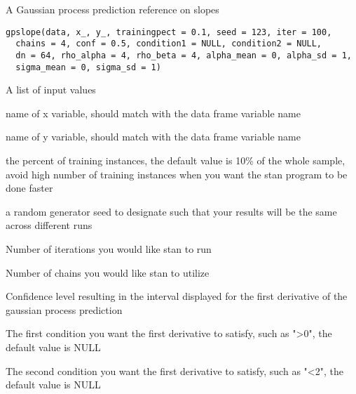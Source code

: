 %
\begin{Description}\relax
A Gaussian process prediction reference on slopes
\end{Description}
%
\begin{Usage}
\begin{verbatim}
gpslope(data, x_, y_, trainingpect = 0.1, seed = 123, iter = 100,
  chains = 4, conf = 0.5, condition1 = NULL, condition2 = NULL,
  dn = 64, rho_alpha = 4, rho_beta = 4, alpha_mean = 0, alpha_sd = 1,
  sigma_mean = 0, sigma_sd = 1)
\end{verbatim}
\end{Usage}
%
\begin{Arguments}
\begin{ldescription}
\item[\code{data}] A list of input values

\item[\code{x\_}] name of x variable, should match with the data frame variable name

\item[\code{y\_}] name of y variable, should match with the data frame variable name

\item[\code{trainingpect}] the percent of training instances, the default value is 10\% of the whole sample, avoid high number of training instances when you want the stan program to be done faster

\item[\code{seed}] a random generator seed to designate such that your results will be the same across different runs

\item[\code{iter}] Number of iterations you would like stan to run

\item[\code{chains}] Number of chains you would like stan to utilize

\item[\code{conf}] Confidence level resulting in the interval displayed for the first derivative of the gaussian process prediction

\item[\code{condition1}] The first condition you want the first derivative to satisfy, such as ">0", the default value is NULL

\item[\code{condition2}] The second condition you want the first derivative to satisfy, such as "<2", the default value is NULL


\end{ldescription}
\end{Arguments}
